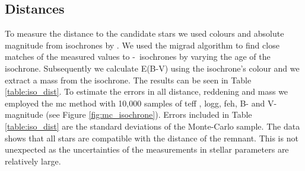 \subsection{Distances}
\label{sec:distance}
To measure the distance to the candidate stars we used colours and absolute magnitude from isochrones by  \citet{2004ApJ...612..168P}. We used the \gls{migrad} algorithm  \citep{James:1975dr} to find close matches of the measured values to \teff-\logg\ isochrones by varying the age of the isochrone.  Subsequently we calculate E(B-V) using the isochrone's colour and we extract a mass from the isochrone. The results can be seen in Table \ref{table:iso_dist}. To estimate the errors in all distance, reddening and mass we employed the \gls{mc}
method with 10,000 samples of \gls{teff} , \gls{logg}, \gls{feh}, B- and V-magnitude (see Figure  \ref{fig:mc_isochrone}).  Errors included in Table \ref{table:iso_dist} are the standard deviations of the Monte-Carlo sample. 
The data shows that all stars are compatible with the distance of the remnant. This is not unexpected as the uncertainties of the measurements in stellar parameters are relatively large.




